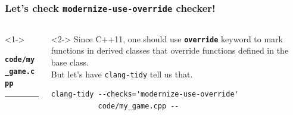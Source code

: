 \documentclass[aspectratio=169]{beamer}
\newcommand{\cpp}[1]{\texttt{\textbf{\textcolor{clCodeBlue}{#1}}}}
\begin{document}
\begin{frame}[fragile]
  \frametitle{Let's check \texttt{modernize-use-override} checker!}
  \begin{columns}[T]
    \begin{column}{0.6\textwidth}<1->
      {\color[HTML]{cb4b16}
      \texttt{\textbf{code/my\_game.cpp}}\vspace{-9pt}
      \rule{\linewidth}{2pt}}%
      {\fontsize{7}{6} }%
      \vspace{-12pt}{\color[HTML]{cb4b16}\rule{\linewidth}{2pt}}
    \end{column}
    \begin{column}{0.4\textwidth}<2->
      Since C++11, one should use \cpp{override} keyword to mark functions in derived classes that override functions defined in the base class.\\
      \vspace*{12pt}%
      But let's have \texttt{clang-tidy} tell us that.\\
      \vspace*{6pt}%

    {\fontsize{6}{6} \begin{lstlisting}[showstringspaces=false]
clang-tidy --checks='modernize-use-override'
           code/my_game.cpp --
    \end{lstlisting}}
    \end{column}
  \end{columns}
\end{frame}
\end{document}
